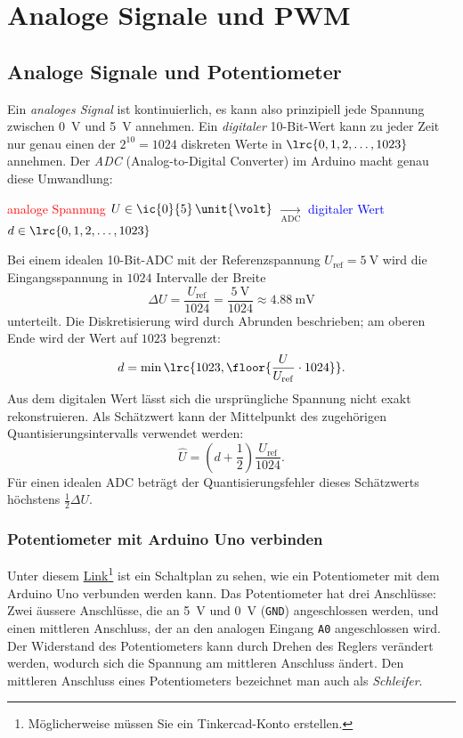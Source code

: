 \chapter{Analoge Signale und PWM}\label{ch:chapter_01}


\section{Analoge Signale und Potentiometer}
Ein \emph{analoges Signal} ist kontinuierlich, es kann also prinzipiell jede Spannung zwischen \qty{0}{\volt} und \qty{5}{\volt} annehmen.
Ein \emph{digitaler} 10-Bit-Wert kann zu jeder Zeit nur genau einen der $2^{10} = 1024$ diskreten Werte in $\lrc{0, 1, 2, \ldots, 1023}$ annehmen.
Der \emph{ADC} (Analog-to-Digital Converter) im Arduino macht genau diese Umwandlung:
\begin{center}
\textcolor{Red}{analoge Spannung $U \in \ic{0}{5}\,\unit{\volt}$} $\underset{\text{ADC}}{\longrightarrow}$ \textcolor{Blue}{digitaler Wert $d \in \lrc{0, 1, 2, \ldots, 1023}$}
\end{center}

Bei einem idealen 10-Bit-ADC mit der Referenzspannung $U_\mathrm{ref} = \qty{5}{\volt}$ wird die Eingangsspannung in $1024$ Intervalle der Breite
\begin{equation}
\Delta U = \frac{U_\mathrm{ref}}{1024} = \frac{\qty{5}{\volt}}{1024} \approx \qty{4.88}{\milli\volt}
\end{equation}
unterteilt. Die Diskretisierung wird durch Abrunden beschrieben; am oberen Ende wird der Wert auf $1023$ begrenzt:
\begin{equation}
d = \min\lrc{1023,\floor{\frac{U}{U_\mathrm{ref}}\cdot 1024}}.
\end{equation}
Aus dem digitalen Wert lässt sich die ursprüngliche Spannung nicht exakt rekonstruieren. Als Schätzwert kann der Mittelpunkt des zugehörigen Quantisierungsintervalls verwendet werden:
\begin{equation}\label{eq:adc-to-voltage}
\widehat{U} = \left(d + \frac{1}{2}\right)\frac{U_\mathrm{ref}}{1024}.
\end{equation}
Für einen idealen ADC beträgt der Quantisierungsfehler dieses Schätzwerts höchstens $\frac{1}{2}\Delta U$.

\subsection{Potentiometer mit Arduino Uno verbinden}
Unter diesem \href{https://www.tinkercad.com/learn/overview/OG8Z4G7L26F9GZ6}{Link}\footnote{Möglicherweise müssen Sie ein Tinkercad-Konto erstellen.} ist ein Schaltplan zu sehen, wie ein Potentiometer mit dem Arduino Uno verbunden werden kann. Das Potentiometer hat drei Anschlüsse: Zwei äussere Anschlüsse, die an \qty{5}{\volt} und \qty{0}{\volt} (\texttt{GND}) angeschlossen werden, und einen mittleren Anschluss, der an den analogen Eingang \texttt{A0} angeschlossen wird. Der Widerstand des Potentiometers kann durch Drehen des Reglers verändert werden, wodurch sich die Spannung am mittleren Anschluss ändert. Den mittleren Anschluss eines Potentiometers bezeichnet man auch als \emph{Schleifer}.

